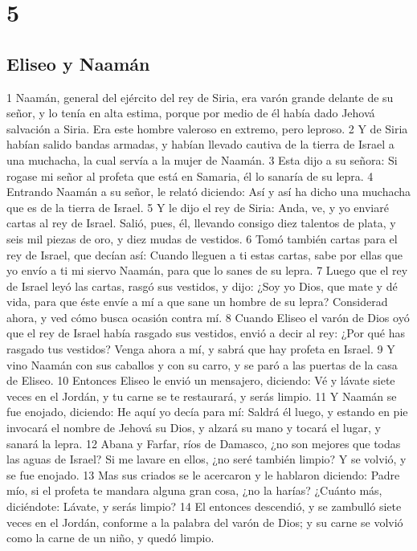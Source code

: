\chapter{5}

\section*{Eliseo y Naamán}

1 Naamán, general del ejército del rey de Siria, era varón grande delante de su señor, y lo tenía en alta estima, porque por medio de él había dado Jehová salvación a Siria. Era este hombre valeroso en extremo, pero leproso.
2 Y de Siria habían salido bandas armadas, y habían llevado cautiva de la tierra de Israel a una muchacha, la cual servía a la mujer de Naamán.
3 Esta dijo a su señora: Si rogase mi señor al profeta que está en Samaria, él lo sanaría de su lepra.
4 Entrando Naamán a su señor, le relató diciendo: Así y así ha dicho una muchacha que es de la tierra de Israel.
5 Y le dijo el rey de Siria: Anda, ve, y yo enviaré cartas al rey de Israel. Salió, pues, él, llevando consigo diez talentos de plata,   y seis mil piezas de oro, y diez mudas de vestidos.
6 Tomó también cartas para el rey de Israel, que decían así: Cuando lleguen a ti estas cartas, sabe por ellas que yo envío a ti mi siervo Naamán, para que lo sanes de su lepra.
7 Luego que el rey de Israel leyó las cartas, rasgó sus vestidos, y dijo: ¿Soy yo Dios, que mate y dé vida, para que éste envíe a mí a que sane un hombre de su lepra? Considerad ahora, y ved cómo busca ocasión contra mí.
8 Cuando Eliseo el varón de Dios oyó que el rey de Israel había rasgado sus vestidos, envió a decir al rey: ¿Por qué has rasgado tus vestidos? Venga ahora a mí, y sabrá que hay profeta en Israel.
9 Y vino Naamán con sus caballos y con su carro, y se paró a las puertas de la casa de Eliseo.
10 Entonces Eliseo le envió un mensajero, diciendo: Vé y lávate siete veces en el Jordán, y tu carne se te restaurará, y serás limpio.
11 Y Naamán se fue enojado, diciendo: He aquí yo decía para mí: Saldrá él luego, y estando en pie invocará el nombre de Jehová su Dios, y alzará su mano y tocará el lugar, y sanará la lepra.
12 Abana y Farfar, ríos de Damasco, ¿no son mejores que todas las aguas de Israel? Si me lavare en ellos, ¿no seré también limpio? Y se volvió, y se fue enojado.
13 Mas sus criados se le acercaron y le hablaron diciendo: Padre mío, si el profeta te mandara alguna gran cosa, ¿no la harías? ¿Cuánto más, diciéndote: Lávate, y serás limpio?
14 El entonces descendió, y se zambulló siete veces en el Jordán, conforme a la palabra del varón de Dios; y su carne se volvió como la carne de un niño, y quedó limpio.
